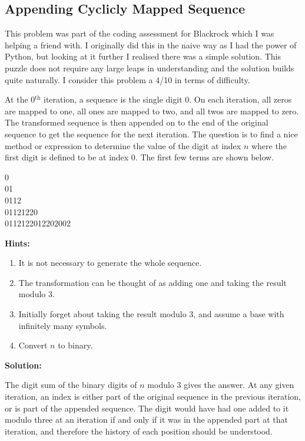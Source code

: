 \subsection{Appending Cyclicly Mapped Sequence}

This problem was part of the coding assessment for Blackrock which I was helping a friend with. I originally did this in the naive way as I had the power of Python, but looking at it further I realised there was a simple solution. This puzzle does not require any large leaps in understanding and the solution builds quite naturally. I consider this problem a 4/10 in terms of difficulty.

At the 0$^\text{th}$ iteration, a sequence is the single digit 0. On each iteration, all zeros are mapped to one, all ones are mapped to two, and all twos are mapped to zero. The transformed sequence is then appended on to the end of the original sequence to get the sequence for the next iteration. The question is to find a nice method or expression to determine the value of the digit at index $n$ where the first digit is defined to be at index 0. The first few terms are shown below.

\begin{center}
    0  \\
    01  \\
    0112  \\
    01121220  \\
    0112122012202002
\end{center}

\textbf{Hints:}

\begin{enumerate}
    \item It is not necessary to generate the whole sequence.
    \item The transformation can be thought of as adding one and taking the result modulo 3.
    \item Initially forget about taking the result modulo 3, and assume a base with infinitely many symbols.
    \item Convert $n$ to binary.
\end{enumerate}

\textbf{Solution:}

The digit sum of the binary digits of $n$ modulo 3 gives the answer. At any given iteration, an index is either part of the original sequence in the previous iteration, or is part of the appended sequence. The digit would have had one added to it modulo three at an iteration if and only if it was in the appended part at that iteration, and therefore the history of each position should be understood.

